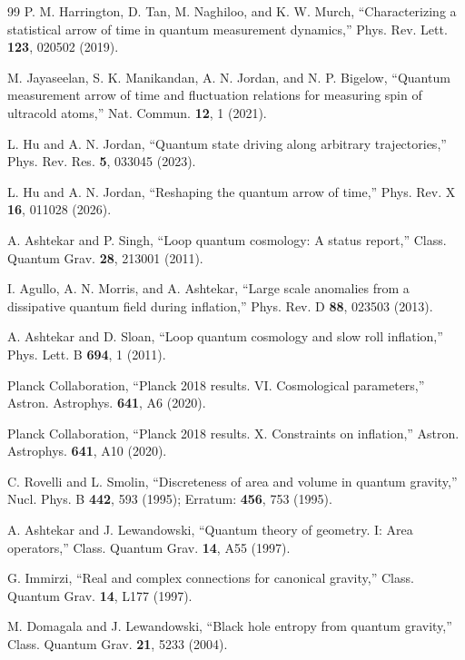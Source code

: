 \documentclass[twocolumn,aps,prd,showpacs,preprintnumbers,longbibliography]{revtex4-2}
\begin{document}
\begin{thebibliography}{99}
		P. M. Harrington, D. Tan, M. Naghiloo, and K. W. Murch, “Characterizing a statistical arrow of time in quantum measurement dynamics,” Phys. Rev. Lett. \textbf{123}, 020502 (2019).
		
		M. Jayaseelan, S. K. Manikandan, A. N. Jordan, and N. P. Bigelow, “Quantum measurement arrow of time and fluctuation relations for measuring spin of ultracold atoms,” Nat. Commun. \textbf{12}, 1 (2021).
		
		L. Hu and A. N. Jordan, “Quantum state driving along arbitrary trajectories,” Phys. Rev. Res. \textbf{5}, 033045 (2023).
		
		L. Hu and A. N. Jordan, “Reshaping the quantum arrow of time,” Phys. Rev. X \textbf{16}, 011028 (2026).
		
		A. Ashtekar and P. Singh, “Loop quantum cosmology: A status report,” Class. Quantum Grav. \textbf{28}, 213001 (2011).
		
		I. Agullo, A. N. Morris, and A. Ashtekar, “Large scale anomalies from a dissipative quantum field during inflation,” Phys. Rev. D \textbf{88}, 023503 (2013).
		
		A. Ashtekar and D. Sloan, “Loop quantum cosmology and slow roll inflation,” Phys. Lett. B \textbf{694}, 1 (2011).
		
		Planck Collaboration, “Planck 2018 results. VI. Cosmological parameters,” Astron. Astrophys. \textbf{641}, A6 (2020).
		
		Planck Collaboration, “Planck 2018 results. X. Constraints on inflation,” Astron. Astrophys. \textbf{641}, A10 (2020).
		
		C. Rovelli and L. Smolin, “Discreteness of area and volume in quantum gravity,” Nucl. Phys. B \textbf{442}, 593 (1995); Erratum: \textbf{456}, 753 (1995).
		
		A. Ashtekar and J. Lewandowski, “Quantum theory of geometry. I: Area operators,” Class. Quantum Grav. \textbf{14}, A55 (1997).
		
		G. Immirzi, “Real and complex connections for canonical gravity,” Class. Quantum Grav. \textbf{14}, L177 (1997).
		
		M. Domagala and J. Lewandowski, “Black hole entropy from quantum gravity,” Class. Quantum Grav. \textbf{21}, 5233 (2004).
		

\end{thebibliography}
\end{document}
